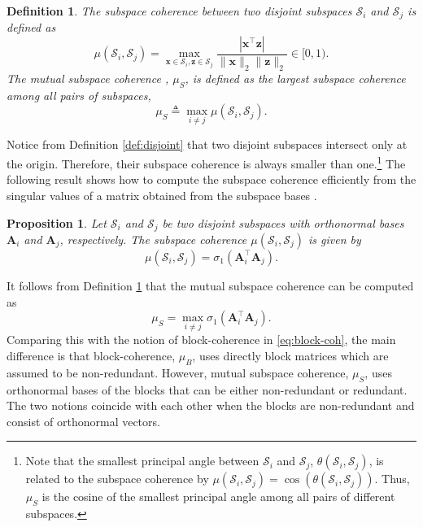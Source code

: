 \documentclass[10pt,twocolumn,twoside] {IEEEtran}
\newtheorem{proposition}{Proposition}
\newtheorem{definition}{Definition}
\begin{document}
\vspace{1mm}
\begin{definition}
\label{def:subspaceangle}
The \emph{subspace coherence} between two disjoint subspaces $\mathcal{S}_i$ and $\mathcal{S}_j$ is defined as
\begin{equation}
\label{eq:sub-coh}
\mu(\mathcal{S}_i,\mathcal{S}_j) = \max_{{{\mathbf x}} \in \mathcal{S}_i, {\boldsymbol{z}} \in \mathcal{S}_j} \frac{| {{\mathbf x}}^{\top} {\boldsymbol{z}} |}{ \| {{\mathbf x}} \|_2  \| {\boldsymbol{z}} \|_2 }  \in [0,1).
\end{equation}
The \emph{mutual subspace coherence} \cite{Ganesh:ICASSP09}, $\mu_S$, is defined as the largest subspace coherence among all pairs of subspaces,
\begin{equation}
\label{eq:mut-sub-coh}
\mu_S \triangleq \max_{i \neq j} \mu(\mathcal{S}_i,\mathcal{S}_j).
\end{equation}
\end{definition}
\vspace{1mm}
Notice from Definition \ref{def:disjoint} that two disjoint subspaces intersect only at the origin. Therefore, their subspace coherence is always smaller than one.\footnote{Note that the smallest principal angle \cite{Golub:MatrixComps96} between $\mathcal{S}_i$ and $\mathcal{S}_j$, $\theta(\mathcal{S}_i,\mathcal{S}_j)$, is related to the subspace coherence by $\mu(\mathcal{S}_i,\mathcal{S}_j) = \cos(\theta(\mathcal{S}_i,\mathcal{S}_j))$. Thus, $\mu_S$ is the cosine of the smallest principal angle among all pairs of different subspaces.} 
The following result shows how to compute the subspace coherence efficiently from the singular values of a matrix obtained from the subspace bases \cite{Golub:MatrixComps96}.
\vspace{1mm}
\begin{proposition}
\label{prop:coherence}
Let $\mathcal{S}_i$ and $\mathcal{S}_j$ be two disjoint subspaces with \emph{orthonormal bases} ${\boldsymbol{A}}_i$ and ${\boldsymbol{A}}_j$, respectively. The subspace coherence $\mu(\mathcal{S}_i,\mathcal{S}_j)$ is given by
\begin{equation} 
\mu(\mathcal{S}_i,\mathcal{S}_j) = \sigma_1({\boldsymbol{A}}_i^{\top} {\boldsymbol{A}}_j).
\end{equation}
\end{proposition}
\vspace{1mm}
It follows from Definition \ref{def:subspaceangle} that the mutual subspace coherence can be computed as
\begin{equation}
\label{eq:mut-coh-svd}
\mu_S = \max_{i \neq j} \sigma_1({\boldsymbol{A}}_i^{\top} {\boldsymbol{A}}_j).
\end{equation}
Comparing this with the notion of block-coherence in \eqref{eq:block-coh}, the main difference is that block-coherence, $\mu_B$, uses directly block matrices which are assumed to be non-redundant. However, mutual subspace coherence, $\mu_S$, uses orthonormal bases of the blocks that can be either non-redundant or redundant. The two notions coincide with each other when the blocks are non-redundant and consist of orthonormal vectors. 
\end{document}
